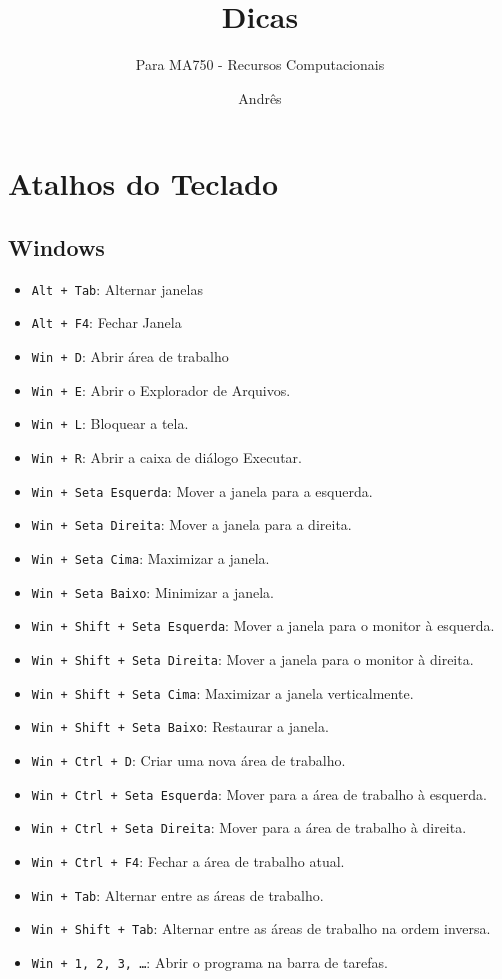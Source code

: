 \documentclass[a4paper, 12pt]{article}
\title{Dicas}
\date{Andrês}
\author{Para MA750 - Recursos Computacionais}
\begin{document}
\maketitle

\tableofcontents

\section{Atalhos do Teclado}\label{atalhos-do-teclado}

\subsection{Windows}\label{windows}

\begin{itemize}
    \item \texttt{Alt + Tab}: Alternar janelas
    \item \texttt{Alt + F4}: Fechar Janela
    \item \texttt{Win + D}: Abrir área de trabalho
    \item \texttt{Win + E}: Abrir o Explorador de Arquivos.
    \item \texttt{Win + L}: Bloquear a tela.
    \item \texttt{Win + R}: Abrir a caixa de diálogo Executar.
    \item \texttt{Win + Seta Esquerda}: Mover a janela para a esquerda.
    \item \texttt{Win + Seta Direita}: Mover a janela para a direita.
    \item \texttt{Win + Seta Cima}: Maximizar a janela.
    \item \texttt{Win + Seta Baixo}: Minimizar a janela.
    \item \texttt{Win + Shift + Seta Esquerda}: Mover a janela para o monitor à esquerda.
    \item \texttt{Win + Shift + Seta Direita}: Mover a janela para o monitor à direita.
    \item \texttt{Win + Shift + Seta Cima}: Maximizar a janela verticalmente.
    \item \texttt{Win + Shift + Seta Baixo}: Restaurar a janela.
    \item \texttt{Win + Ctrl + D}: Criar uma nova área de trabalho.
    \item \texttt{Win + Ctrl + Seta Esquerda}: Mover para a área de trabalho à esquerda.
    \item \texttt{Win + Ctrl + Seta Direita}: Mover para a área de trabalho à direita.
    \item \texttt{Win + Ctrl + F4}: Fechar a área de trabalho atual.
    \item \texttt{Win + Tab}: Alternar entre as áreas de trabalho.
    \item \texttt{Win + Shift + Tab}: Alternar entre as áreas de trabalho na ordem inversa.
    \item \texttt{Win + 1, 2, 3, \ldots}: Abrir o programa na barra de tarefas.
\end{itemize}
\end{document}
